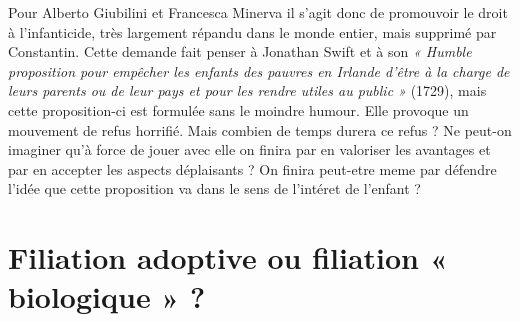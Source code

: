  Pour Alberto Giubilini et Francesca Minerva  il  s'agit donc de promouvoir le droit à l'infanticide, très largement répandu dans le monde entier, mais supprimé par Constantin. Cette demande fait penser à Jonathan Swift et à son \emph{« Humble proposition pour empêcher les enfants des pauvres en Irlande d'être à la charge de leurs parents ou de leur pays et pour les rendre utiles au public »} (1729), mais cette proposition-ci  est formulée sans le moindre humour. Elle provoque un mouvement de refus horrifié. Mais combien de temps durera ce refus ? Ne peut-on imaginer qu'à force de jouer avec elle on finira par en valoriser les avantages et par en accepter les aspects déplaisants  ? On finira peut-etre meme par défendre l'idée que cette proposition va dans le sens de l'intéret de l'enfant ?

 \section{Filiation adoptive ou filiation « biologique » ?} 
 
